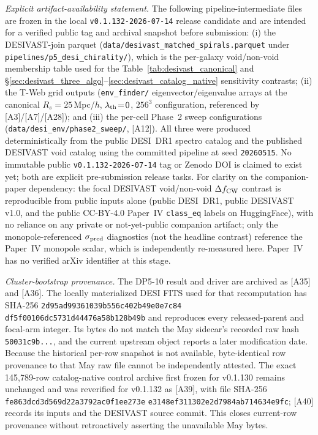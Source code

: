 \documentclass[aps,prd,twocolumn,superscriptaddress,showpacs,preprintnumbers,nofootinbib,longbibliography,floatfix]{revtex4-2}
\newcommand{\paperVersion}{v0.1.132-2026-07-14}
\begin{document}
\emph{Explicit artifact-availability statement.}
The following pipeline-intermediate files are frozen in the local
\texttt{\paperVersion} release candidate and are intended for a verified
public tag and archival snapshot before submission:
(i) the DESIVAST-join parquet
(\texttt{data/desivast\_matched\_spirals.parquet} under
\texttt{pipelines/p5\_desi\_chirality/}),
which is the per-galaxy void/non-void membership table used for the
Table~\ref{tab:desivast_canonical} and
\S\ref{sec:desivast_three_algo}--\ref{sec:desivast_catalog_native}
sensitivity contrasts;
(ii) the T-Web grid outputs
(\texttt{env\_finder/} eigenvector/eigenvalue arrays at the
canonical $R_s\!=\!25$\,Mpc/$h$, $\lambda_{\rm th}\!=\!0$, $256^3$
configuration, referenced by [A3]/[A7]/[A28]);
and (iii) the per-cell Phase~2 sweep configurations
(\texttt{data/desi\_env/phase2\_sweep/}, [A12]).
All three were produced deterministically from the public DESI~DR1
spectro catalog and the published DESIVAST void catalog using the
committed pipeline at seed \texttt{20260515}.
No immutable public \texttt{\paperVersion} tag or Zenodo DOI is claimed to
exist yet; both are explicit pre-submission release tasks. For clarity on the
companion-paper dependency: the focal DESIVAST void/non-void
$\Delta f_{\rm CW}$ contrast is reproducible from public inputs alone
(public DESI~DR1, public DESIVAST v1.0, and the public CC-BY-4.0 Paper~IV
\texttt{class\_eq} labels on HuggingFace), with no reliance on any private
or not-yet-public companion artifact; only the monopole-referenced
$\sigma_{\rm pred}$ diagnostics (not the headline contrast) reference the
Paper~IV monopole scalar, which is independently re-measured here.
Paper~IV has no verified arXiv identifier at this stage.

\emph{Cluster-bootstrap provenance.} The DP5-10 result and driver are
archived as [A35] and [A36]. The locally materialized DESI FITS used for
that recomputation has SHA-256
\texttt{2d95ad99361039b5}\allowbreak\texttt{56c402b49e0e7c84}\allowbreak
\texttt{df5f00106dc5731d}\allowbreak\texttt{44476a58b128b49b}
and reproduces every released-parent and focal-arm integer. Its bytes
do not match the May sidecar's recorded raw hash
\texttt{50031c9b...}, and the current upstream object reports a later
modification date. Because the historical per-row snapshot is not
available, byte-identical row provenance to that May raw file cannot be
independently attested. The exact 145,789-row catalog-native control
archive first frozen for v0.1.130 remains unchanged and was reverified for
v0.1.132 as [A39], with file SHA-256
\texttt{fe863dcd3d569d22a3792ac0f1ee273e}
\texttt{e3148ef311302e2d7984ab714634e9fc}; [A40] records its inputs and the
DESIVAST source commit. This closes current-row provenance without
retroactively asserting the unavailable May bytes.
\end{document}
